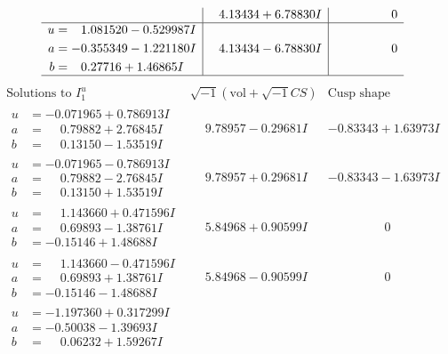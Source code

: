 \documentclass[1p]{elsarticle_modified}
\theoremstyle{definition}
\newcommand{\I}{\sqrt{-1}}
\begin{document}
$$\begin{array}{c|c|c}
 & \phantom{-}4.13434 + 6.78830 I & \phantom{-0.000000 } 0 \\ \hline\begin{aligned}
u &= \phantom{-}1.081520 - 0.529987 I \\
a &= -0.355349 - 1.221180 I \\
b &= \phantom{-}0.27716 + 1.46865 I\end{aligned}
 & \phantom{-}4.13434 - 6.78830 I & \phantom{-0.000000 } 0\\
 \hline 
 \end{array}$$\newpage$$\begin{array}{c|c|c}  
\text{Solutions to }I^u_{1}& \I (\text{vol} + \sqrt{-1}CS) & \text{Cusp shape}\\
 \hline 
\begin{aligned}
u &= -0.071965 + 0.786913 I \\
a &= \phantom{-}0.79882 + 2.76845 I \\
b &= \phantom{-}0.13150 - 1.53519 I\end{aligned}
 & \phantom{-}9.78957 - 0.29681 I & -0.83343 + 1.63973 I \\ \hline\begin{aligned}
u &= -0.071965 - 0.786913 I \\
a &= \phantom{-}0.79882 - 2.76845 I \\
b &= \phantom{-}0.13150 + 1.53519 I\end{aligned}
 & \phantom{-}9.78957 + 0.29681 I & -0.83343 - 1.63973 I \\ \hline\begin{aligned}
u &= \phantom{-}1.143660 + 0.471596 I \\
a &= \phantom{-}0.69893 - 1.38761 I \\
b &= -0.15146 + 1.48688 I\end{aligned}
 & \phantom{-}5.84968 + 0.90599 I & \phantom{-0.000000 } 0 \\ \hline\begin{aligned}
u &= \phantom{-}1.143660 - 0.471596 I \\
a &= \phantom{-}0.69893 + 1.38761 I \\
b &= -0.15146 - 1.48688 I\end{aligned}
 & \phantom{-}5.84968 - 0.90599 I & \phantom{-0.000000 } 0 \\ \hline\begin{aligned}
u &= -1.197360 + 0.317299 I \\
a &= -0.50038 - 1.39693 I \\
b &= \phantom{-}0.06232 + 1.59267 I\end{aligned}

\end{array}$$
\end{document}
